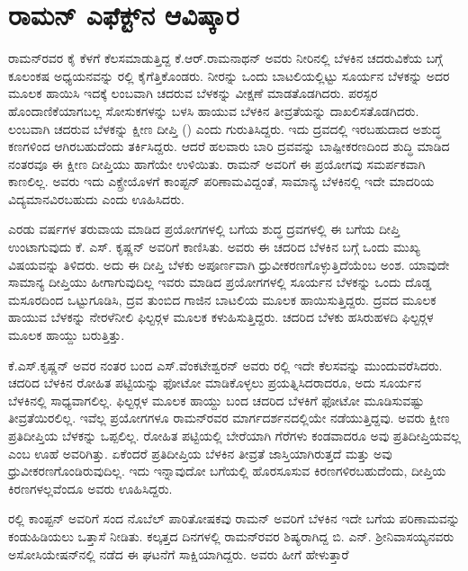 \section{ರಾಮನ್ ಎಫೆಕ್ಟ್‌ನ ಆವಿಷ್ಕಾರ}

ರಾಮನ್‍ರವರ ಕೈ ಕೆಳಗೆ ಕೆಲಸಮಾಡುತ್ತಿದ್ದ ಕೆ.ಆರ್.ರಾಮನಾಥನ್ ಅವರು ನೀರಿನಲ್ಲಿ ಬೆಳಕಿನ ಚದರುವಿಕೆಯ ಬಗ್ಗೆ ಕೂಲಂಕಷ ಅಧ್ಯಯನವನ್ನು ರಲ್ಲಿ ಕೈಗೆತ್ತಿಕೊಂಡರು. ನೀರನ್ನು ಒಂದು ಬಾಟಲಿಯಲ್ಲಿಟ್ಟು ಸೂರ್ಯನ ಬೆಳಕನ್ನು ಅದರ ಮೂಲಕ ಹಾಯಿಸಿ ಇದಕ್ಕೆ ಲಂಬವಾಗಿ ಚದರುವ ಬೆಳಕನ್ನು ವೀಕ್ಷಣೆ ಮಾಡತೊಡಗಿದರು. ಪರಸ್ಪರ ಹೊಂದಾಣಿಕೆಯಾಗಬಲ್ಲ ಸೋಸುಕಗಳನ್ನು ಬಳಸಿ ಹಾಯುವ ಬೆಳಕಿನ ತೀವ್ರತೆಯನ್ನು ದಾಖಲಿಸತೊಡಗಿದರು. ಲಂಬವಾಗಿ ಚದರುವ ಬೆಳಕನ್ನು ಕ್ಷೀಣ ದೀಪ್ತಿ () ಎಂದು ಗುರುತಿಸಿದ್ದರು. ಇದು ದ್ರವದಲ್ಲಿ ಇರಬಹುದಾದ ಅಶುದ್ಧ ಕಣಗಳಿಂದ ಆಗಿರಬಹುದೆಂದು ತರ್ಕಿಸಿದ್ದರು. ಆದರೆ ಹಲವಾರು ಬಾರಿ ದ್ರವವನ್ನು ಬಾಷ್ಪೀಕರಣದಿಂದ ಶುದ್ಧಿ ಮಾಡಿದ ನಂತರವೂ ಈ ಕ್ಷೀಣ ದೀಪ್ತಿಯು ಹಾಗೆಯೇ ಉಳಿಯಿತು. ರಾಮನ್ ಅವರಿಗೆ ಈ ಪ್ರಯೋಗವು ಸಮರ್ಪಕವಾಗಿ ಕಾಣಲಿಲ್ಲ. ಅವರು ಇದು ಎಕ್ಸ್\enginline{-}ರೇಯೊಳಗೆ ಕಾಂಪ್ಟನ್ ಪರಿಣಾಮವಿದ್ದಂತೆ, ಸಾಮಾನ್ಯ ಬೆಳಕಿನಲ್ಲಿ ಇದೇ ಮಾದರಿಯ ವಿದ್ಯಮಾನವಿರಬಹುದು ಎಂದು ಊಹಿಸಿದರು.

ಎರಡು ವರ್ಷಗಳ ತರುವಾಯ ಮಾಡಿದ ಪ್ರಯೋಗಗಳಲ್ಲಿ  ಬಗೆಯ ಶುದ್ಧ ದ್ರವಗಳಲ್ಲಿ ಈ ಬಗೆಯ ದೀಪ್ತಿ ಉಂಟಾಗುವುದು ಕೆ. ಎಸ್. ಕೃಷ್ಣನ್ ಅವರಿಗೆ ಕಾಣಿಸಿತು. ಅವರು ಈ ಚದರಿದ ಬೆಳಕಿನ ಬಗ್ಗೆ ಒಂದು ಮುಖ್ಯ ವಿಷಯವನ್ನು ತಿಳಿದರು. ಅದು ಈ ದೀಪ್ತಿ ಬೆಳಕು ಅಪೂರ್ಣವಾಗಿ ಧ್ರುವೀಕರಣಗೊಳ್ಳುತ್ತಿದೆಯೆಂಬ ಅಂಶ. ಯಾವುದೇ ಸಾಮಾನ್ಯ ದೀಪ್ತಿಯು ಹೀಗಾಗುವುದಿಲ್ಲ ಇವರು ಮಾಡಿದ ಪ್ರಯೋಗಗಳಲ್ಲಿ ಸೂರ್ಯನ ಬೆಳಕನ್ನು ಒಂದು ದೊಡ್ಡ ಮಸೂರದಿಂದ ಒಟ್ಟುಗೂಡಿಸಿ, ದ್ರವ ತುಂಬಿದ ಗಾಜಿನ ಬಾಟಲಿಯ ಮೂಲಕ ಹಾಯಿಸುತ್ತಿದ್ದರು. ದ್ರವದ ಮೂಲಕ ಹಾಯುವ ಬೆಳಕನ್ನು ನೇರಳೆ\enginline{-}ನೀಲಿ ಫಿಲ್ಟರ್‍ಗಳ ಮೂಲಕ ಕಳುಹಿಸುತ್ತಿದ್ದರು. ಚದರಿದ ಬೆಳಕು ಹಸಿರು\enginline{-}ಹಳದಿ ಫಿಲ್ಟರ್‍ಗಳ ಮೂಲಕ ಹಾಯ್ದು ಬರುತ್ತಿತ್ತು.

ಕೆ.ಎಸ್.ಕೃಷ್ಣನ್ ಅವರ ನಂತರ ಬಂದ ಎಸ್.ವೆಂಕಟೇಶ್ವರನ್ ಅವರು ರಲ್ಲಿ ಇದೇ ಕೆಲಸವನ್ನು ಮುಂದುವರೆಸಿದರು. ಚದರಿದ ಬೆಳಕಿನ ರೋಹಿತ ಪಟ್ಟಿಯನ್ನು ಫೋಟೋ ಮಾಡಿಕೊಳ್ಳಲು ಪ್ರಯತ್ನಿಸಿದರಾದರೂ, ಅದು ಸೂರ್ಯನ ಬೆಳಕಿನಲ್ಲಿ ಸಾಧ್ಯವಾಗಲಿಲ್ಲ. ಫಿಲ್ಟರ್‍ಗಳ ಮೂಲಕ ಹಾಯ್ದು ಬಂದ ಚದರಿದ ಬೆಳಕಿಗೆ ಫೋಟೋ ಮೂಡಿಸುವಷ್ಟು ತೀವ್ರತೆಯಿರಲಿಲ್ಲ. ಇವೆಲ್ಲ ಪ್ರಯೋಗಗಳೂ ರಾಮನ್‍ರವರ ಮಾರ್ಗದರ್ಶನದಲ್ಲಿಯೇ ನಡೆಯುತ್ತಿದ್ದವು. ಅವರು ಕ್ಷೀಣ ಪ್ರತಿದೀಪ್ತಿಯ ಬೆಳಕನ್ನು ಒಪ್ಪಲಿಲ್ಲ. ರೋಹಿತ ಪಟ್ಟಿಯಲ್ಲಿ ಬೇರೆಯಾಗಿ ಗೆರೆಗಳು ಕಂಡವಾದರೂ ಅವು ಪ್ರತಿದೀಪ್ತಿಯವಲ್ಲ ಎಂಬ ಊಹೆ ಅವರಿಗಿತ್ತು. ಏಕೆಂದರೆ ಪ್ರತಿದೀಪ್ತಿಯ ಬೆಳಕಿನ ತೀವ್ರತೆ ಜಾಸ್ತಿಯಾಗಿರುತ್ತದೆ ಮತ್ತು ಅವು ಧ್ರುವೀಕರಣಗೊಂಡಿರುವುದಿಲ್ಲ. ಇದು ಇನ್ನಾವುದೋ ಬಗೆಯಲ್ಲಿ ಹೊರಸೂಸುವ ಕಿರಣಗಳಿರಬಹುದೆಂದು, ದೀಪ್ತಿಯ ಕಿರಣಗಳಲ್ಲವೆಂದೂ ಅವರು ಊಹಿಸಿದ್ದರು.

ರಲ್ಲಿ ಕಾಂಪ್ಟನ್ ಅವರಿಗೆ ಸಂದ ನೊಬೆಲ್ ಪಾರಿತೋಷಕವು ರಾಮನ್ ಅವರಿಗೆ ಬೆಳಕಿನ ಇದೇ ಬಗೆಯ ಪರಿಣಾಮವನ್ನು ಕಂಡುಹಿಡಿಯಲು ಒತ್ತಾಸೆ ನೀಡಿತು. ಕಲ್ಕತ್ತದ ದಿನಗಳಲ್ಲಿ ರಾಮನ್‍ರವರ ಶಿಷ್ಯರಾಗಿದ್ದ ಬಿ. ಎನ್. ಶ‍್ರೀನಿವಾಸಯ್ಯನವರು ಅಸೋಸಿಯೇಷನ್‍ನಲ್ಲಿ ನಡೆದ ಈ ಘಟನೆಗೆ ಸಾಕ್ಷಿಯಾಗಿದ್ದರು. ಅವರು ಹೀಗೆ ಹೇಳುತ್ತಾರೆ\enginline{-}

